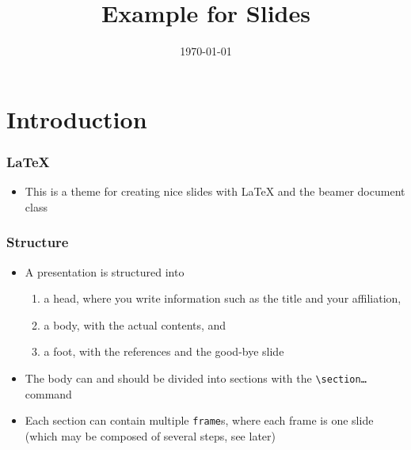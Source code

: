 \documentclass[mathserif]{beamer}%
\title{Example for Slides}%
\date{\today}%
\begin{document}
%
%
\startPresentation{}%
%
%
%
%
\section{Introduction}%
%
\begin{frame}%
\frametitle{\LaTeX}%
\begin{itemize}%
\item This is a theme for creating nice slides with \LaTeX{} and the beamer document class%
\end{itemize}%
\end{frame}%
%
\begin{frame}%
\frametitle{Structure}%
\begin{itemize}%
\item A presentation is structured into%
\begin{enumerate}%
\item a head, where you write information such as the title and your affiliation,%
\item a body, with the actual contents, and%
\item a foot, with the references and the good-bye slide%
\end{enumerate}%
\item The body can and should be divided into sections with the \texttt{{\textbackslash}section{\dots}} command%
\item Each section can contain multiple \texttt{frame}s, where each frame is one slide (which may be composed of several steps, see later)%
\end{itemize}%
\end{frame}%
%
\end{document}
